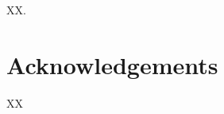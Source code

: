  
 \noindent XX.
 
 

 


\chapter*{Acknowledgements} 

XX

\setcounter{tocdepth}{2}

\tableofcontents

\cleardoublepage 
\listoffigures
\bgroup\let\clearpage\relax\listoftables\egroup %


\mainmatterchapters
\endinput
